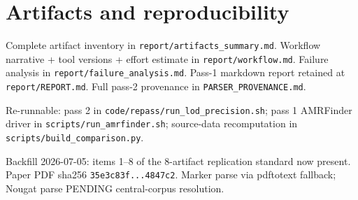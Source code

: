 \documentclass[11pt,a4paper]{article}
\begin{document}
\section{Artifacts and reproducibility}

Complete artifact inventory in \texttt{report/artifacts\_summary.md}. Workflow narrative + tool versions + effort estimate in \texttt{report/workflow.md}. Failure analysis in \texttt{report/failure\_analysis.md}. Pass-1 markdown report retained at \texttt{report/REPORT.md}. Full pass-2 provenance in \texttt{PARSER\_PROVENANCE.md}.

Re-runnable: pass 2 in \texttt{code/repass/run\_lod\_precision.sh}; pass 1 AMRFinder driver in \texttt{scripts/run\_amrfinder.sh}; source-data recomputation in \texttt{scripts/build\_comparison.py}.

\vfill
\begin{center}
\small
Backfill 2026-07-05: items 1--8 of the 8-artifact replication standard now present. Paper PDF sha256 \texttt{35e3c83f...4847c2}. Marker parse via pdftotext fallback; Nougat parse PENDING central-corpus resolution.
\end{center}
\end{document}
